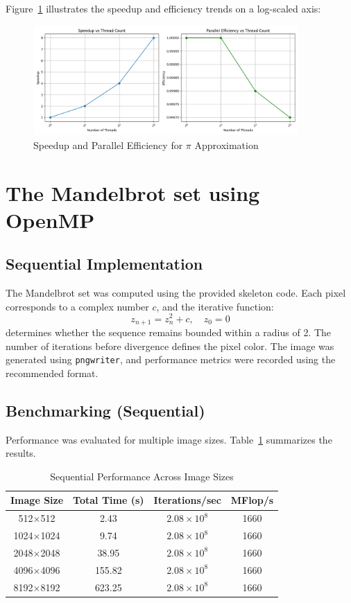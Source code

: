 \documentclass[unicode,11pt,a4paper,oneside,numbers=endperiod,openany]{scrartcl}
\begin{document}
Figure~\ref{fig:pi_scaling_plots} illustrates the speedup and efficiency trends on a log-scaled axis:

\begin{figure}[h!]
\centering
\includegraphics[width=0.9\textwidth]{./figures/Figure 5: updated_pi_scaling_plots.png}
\caption{Speedup and Parallel Efficiency for $\pi$ Approximation}
\label{fig:pi_scaling_plots}
\end{figure}


\newpage
\section{The Mandelbrot set using OpenMP }

\subsection{Sequential Implementation}
The Mandelbrot set was computed using the provided skeleton code. Each pixel corresponds to a complex number $c$, and the iterative function:
\[
z_{n+1} = z_n^2 + c, \quad z_0 = 0
\]
determines whether the sequence remains bounded within a radius of 2. The number of iterations before divergence defines the pixel color. The image was generated using \texttt{pngwriter}, and performance metrics were recorded using the recommended format.

\subsection{Benchmarking (Sequential)}
Performance was evaluated for multiple image sizes. Table~\ref{tab:seq_perf} summarizes the results.

\begin{table}[h!]
\centering
\caption{Sequential Performance Across Image Sizes}
\label{tab:seq_perf}
\begin{tabular}{|c|c|c|c|}
\hline
\textbf{Image Size} & \textbf{Total Time (s)} & \textbf{Iterations/sec} & \textbf{MFlop/s} \\
\hline
512$\times$512    & 2.43   & $2.08\times10^8$ & 1660 \\
1024$\times$1024  & 9.74   & $2.08\times10^8$ & 1660 \\
2048$\times$2048  & 38.95  & $2.08\times10^8$ & 1660 \\
4096$\times$4096  & 155.82 & $2.08\times10^8$ & 1660 \\
8192$\times$8192  & 623.25 & $2.08\times10^8$ & 1660 \\
\hline
\end{tabular}
\end{table}
\end{document}
